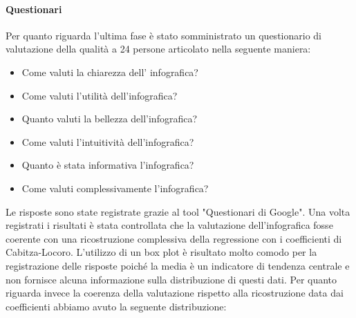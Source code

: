 \documentclass[10pt, a4paper,openany]{article}
\begin{document}
\paragraph{Questionari} Per quanto riguarda l'ultima fase è stato somministrato un questionario di valutazione della qualità a 24 persone articolato nella seguente maniera:
\begin{itemize}
	\item Come valuti la chiarezza dell' infografica?
	\item Come valuti l'utilità dell'infografica?
	\item Quanto valuti la bellezza dell'infografica?
	\item Come valuti l'intuitività dell'infografica?
	\item Quanto è stata informativa l'infografica?
	\item Come valuti complessivamente l'infografica?
\end{itemize}
Le risposte sono state registrate grazie al tool "Questionari di Google". Una volta registrati i risultati è stata controllata che la valutazione dell'infografica fosse coerente con una ricostruzione complessiva della regressione con i coefficienti di Cabitza-Locoro.
L'utilizzo di un box plot è risultato molto comodo per la registrazione delle risposte poiché la media è un indicatore di tendenza centrale e non fornisce alcuna informazione sulla distribuzione di questi dati.
Per quanto riguarda invece la coerenza della valutazione rispetto alla ricostruzione data dai coefficienti abbiamo avuto la seguente distribuzione:
\end{document}
